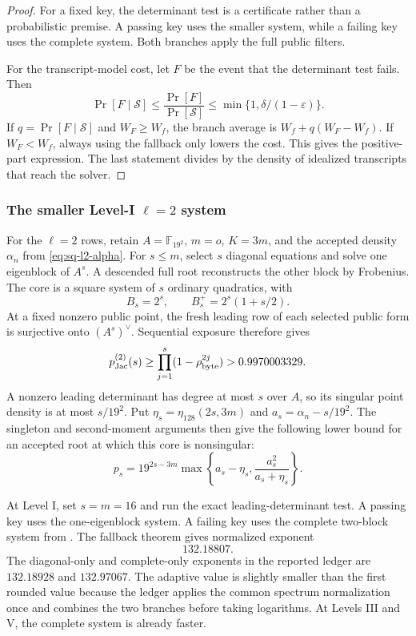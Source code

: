 \documentclass[11pt]{article}
\newcommand{\F}{\mathbb F}
\begin{document}
\begin{proof}
For a fixed key, the determinant test is a certificate rather than a
probabilistic premise.  A passing key uses the smaller system, while a failing
key uses the complete system.  Both branches apply the full public filters.

For the transcript-model cost, let $F$ be the event that the determinant test
fails.  Then
\[
 \Pr[F\mid\mathcal S]
 \le\frac{\Pr[F]}{\Pr[\mathcal S]}
 \le\min\{1,\delta/(1-\varepsilon)\}.
\]
If $q=\Pr[F\mid\mathcal S]$ and $W_F\ge W_f$, the branch average is
$W_f+q(W_F-W_f)$.  If $W_F<W_f$, always using the fallback only lowers the
cost.  This gives the positive-part expression.  The last statement divides
by the density of idealized transcripts that reach the solver.
\end{proof}

\subsubsection{The smaller Level-I \texorpdfstring{$\ell=2$}{ell=2} system}

For the $\ell=2$ rows, retain $A=\F_{19^2}$, $m=o$, $K=3m$, and the accepted
density $\alpha_n$ from \eqref{eq:sq-l2-alpha}.  For $s\le m$, select $s$
diagonal equations and solve one eigenblock of
$A^s$.  A descended full root reconstructs the other block by Frobenius.
The core is a square system of $s$ ordinary quadratics, with
\[
 B_s=2^s,\qquad B_s^+=2^s(1+s/2).
\]
At a fixed nonzero public point, the fresh leading row of each selected
public form is surjective onto $(A^s)^\vee$.  Sequential exposure therefore
gives
\begin{equation}
 p_{\rm Jac}^{(2)}(s)
 \ge\prod_{j=1}^s(1-\rho_{\rm byte}^{2j})>0.9970003329.          \label{eq:sq-l2-jac}
\end{equation}
A nonzero leading determinant has degree at most $s$ over $A$, so its singular
point density is at most $s/19^2$.  Put
$\eta_s=\eta_{128}(2s,3m)$ and $a_s=\alpha_n-s/19^2$.  The singleton and
second-moment arguments then give the following lower bound for an accepted
root at which this core is nonsingular:
\begin{equation}
 p_s=19^{2s-3m}
 \max\left\{
   a_s-\eta_s,
   \frac{a_s^2}{a_s+\eta_s}
 \right\}.                                           \label{eq:sq-l2-diag-root}
\end{equation}

At Level I, set $s=m=16$ and run the exact leading-determinant test.  A passing
key uses the one-eigenblock system.  A failing key uses the complete two-block
system from .  The fallback theorem gives normalized
exponent
\begin{equation}
 \boxed{132.18807}.                                   \label{eq:sq-l2-I-adaptive}
\end{equation}
The diagonal-only and complete-only exponents in the reported ledger are
$132.18928$ and $132.97067$.  The adaptive value is slightly smaller than
the first rounded value because the ledger applies the common spectrum
normalization once and combines the two branches before taking logarithms.
At Levels III and V, the complete system is already faster.
\end{document}
